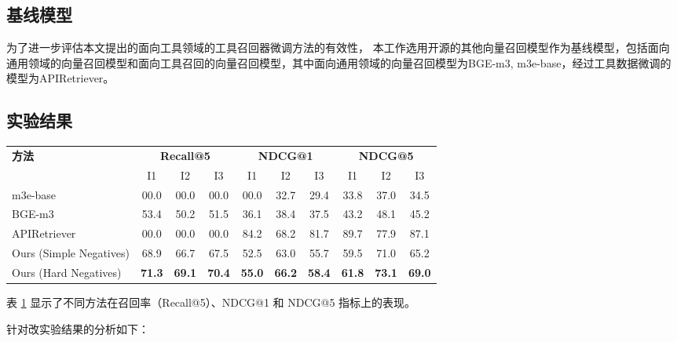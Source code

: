 \subsection{基线模型}

为了进一步评估本文提出的面向工具领域的工具召回器微调方法的有效性，
本工作选用开源的其他向量召回模型作为基线模型，包括面向
通用领域的向量召回模型和面向工具召回的向量召回模型，其中面向通用领域的向量召回模型为BGE-m3\cite{chen2024bge}, m3e-base\cite{moka2024m3e}，经过工具数据微调的模型为APIRetriever\cite{Qin2023}。

\subsection{实验结果}

\begin{table}[!ht]
  \centering
  \label{tab:comparison}
  \begin{tabular}{l|ccc|ccc|ccc}
    \toprule
    \textbf{方法} & \multicolumn{3}{c|}{\textbf{Recall@5}} & \multicolumn{3}{c|}{\textbf{NDCG@1}} & \multicolumn{3}{c}{\textbf{NDCG@5}} \\
    & I1 & I2 & I3 & I1 & I2 & I3 & I1 & I2 & I3 \\
    \midrule

    m3e-base            & 00.0 & 00.0 & 00.0 & 00.0 & 32.7 & 29.4 & 33.8 & 37.0 & 34.5 \\
    BGE-m3         & 53.4 & 50.2 & 51.5 & 36.1 & 38.4 & 37.5 & 43.2 & 48.1 & 45.2 \\
    APIRetriever & 00.0 & 00.0 & 00.0 & 84.2 & 68.2 & 81.7 & 89.7 & 77.9 & 87.1 \\
    Ours (Simple Negatives)   & 68.9 & 66.7 & 67.5 & 52.5 & 63.0 & 55.7 & 59.5 & 71.0 & 65.2 \\
    Ours (Hard Negatives)     & \textbf{71.3} & \textbf{69.1} & \textbf{70.4} & \textbf{55.0} & \textbf{66.2} & \textbf{58.4} & \textbf{61.8} & \textbf{73.1} & \textbf{69.0} \\ 
    \bottomrule
  \end{tabular}
\end{table}

表 \ref{tab:comparison} 显示了不同方法在召回率（Recall@5）、NDCG@1 和 NDCG@5 指标上的表现。

针对改实验结果的分析如下：

